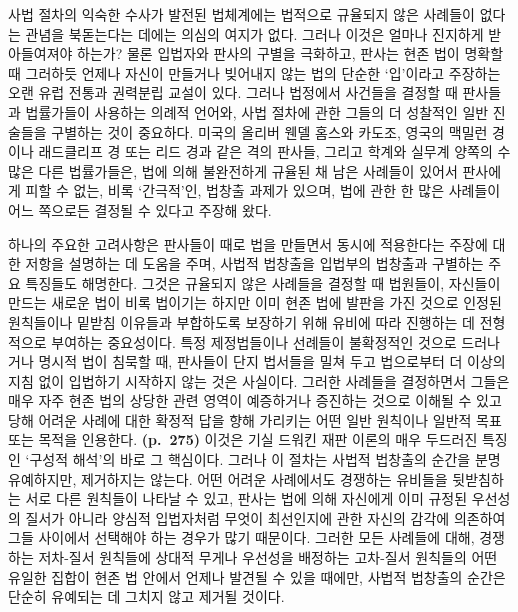사법 절차의 익숙한 수사가 발전된 법체계에는 법적으로 규율되지 않은
사례들이 없다는 관념을 북돋는다는 데에는 의심의 여지가 없다. 그러나
이것은 얼마나 진지하게 받아들여져야 하는가? 물론 입법자와 판사의 구별을
극화하고, 판사는 현존 법이 명확할 때 그러하듯 언제나 자신이 만들거나
빚어내지 않는 법의 단순한 ‘입’이라고 주장하는 오랜 유럽 전통과 권력분립
교설이 있다. 그러나 법정에서 사건들을 결정할 때 판사들과 법률가들이
사용하는 의례적 언어와, 사법 절차에 관한 그들의 더 성찰적인 일반
진술들을 구별하는 것이 중요하다. 미국의 올리버 웬델 홈스와 카도조,
영국의 맥밀런 경이나 래드클리프 경 또는 리드 경과 같은 격의 판사들,
그리고 학계와 실무계 양쪽의 수많은 다른 법률가들은, 법에 의해 불완전하게
규율된 채 남은 사례들이 있어서 판사에게 피할 수 없는, 비록 ‘간극적’인,
법창출 과제가 있으며, 법에 관한 한 많은 사례들이 어느 쪽으로든 결정될 수
있다고 주장해 왔다.

하나의 주요한 고려사항은 판사들이 때로 법을 만들면서 동시에 적용한다는
주장에 대한 저항을 설명하는 데 도움을 주며, 사법적 법창출을 입법부의
법창출과 구별하는 주요 특징들도 해명한다. 그것은 규율되지 않은 사례들을
결정할 때 법원들이, 자신들이 만드는 새로운 법이 비록 
법이기는 하지만 이미 현존 법에 발판을 가진 것으로 인정된 원칙들이나
밑받침 이유들과 부합하도록 보장하기 위해 유비에 따라 진행하는 데
전형적으로 부여하는 중요성이다. 특정 제정법들이나 선례들이 불확정적인
것으로 드러나거나 명시적 법이 침묵할 때, 판사들이 단지 법서들을 밀쳐
두고 법으로부터 더 이상의 지침 없이 입법하기 시작하지 않는 것은
사실이다. 그러한 사례들을 결정하면서 그들은 매우 자주 현존 법의 상당한
관련 영역이 예증하거나 증진하는 것으로 이해될 수 있고 당해 어려운 사례에
대한 확정적 답을 향해 가리키는 어떤 일반 원칙이나 일반적 목표 또는
목적을 인용한다. \textbf{(p.~275)} 이것은 기실 드워킨 재판 이론의 매우
두드러진 특징인 ‘구성적 해석’의 바로 그 핵심이다. 그러나 이 절차는
사법적 법창출의 순간을 분명 유예하지만, 제거하지는 않는다. 어떤 어려운
사례에서도 경쟁하는 유비들을 뒷받침하는 서로 다른 원칙들이 나타날 수
있고, 판사는 법에 의해 자신에게 이미 규정된 우선성의 질서가 아니라
양심적 입법자처럼 무엇이 최선인지에 관한 자신의 감각에 의존하여 그들
사이에서 선택해야 하는 경우가 많기 때문이다. 그러한 모든 사례들에 대해,
경쟁하는 저차-질서 원칙들에 상대적 무게나 우선성을 배정하는 고차-질서
원칙들의 어떤 유일한 집합이 현존 법 안에서 언제나 발견될 수 있을 때에만,
사법적 법창출의 순간은 단순히 유예되는 데 그치지 않고 제거될 것이다.

